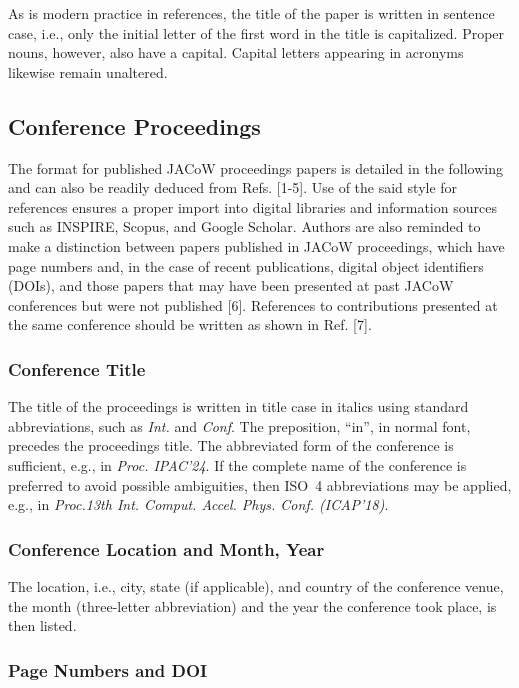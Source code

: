 \documentclass[%
               hyphens,       %
               ]{jacow}
\begin{document}
As is modern practice in references, the title of the paper is written in sentence case, i.e., only the initial letter of the first word in the title is capitalized. Proper nouns, however, also have a capital. Capital letters appearing in acronyms likewise remain unaltered.

\subsection{Conference Proceedings}

The format for published JACoW proceedings papers is detailed in the following and can also be readily deduced from Refs. [1-5]. Use of the said style for references ensures a proper import into digital libraries and information sources such as INSPIRE, Scopus, and Google Scholar. Authors are also reminded to make a distinction between papers published in JACoW proceedings, which have page numbers and, in the case of recent publications, digital object identifiers (DOIs), and those papers that may have been presented at past JACoW conferences but were not published [6]. References to contributions presented at the same conference should be written as shown in Ref. [7].

\subsubsection{Conference Title}

The title of the proceedings is written in title case in italics using standard abbreviations, 
such as \textit{Int.} and \textit{Conf}. The preposition, “in”, in normal font, precedes the proceedings title. The abbreviated form of the conference is sufficient, e.g., in \textit{Proc. IPAC’24}. If the complete name of the conference is preferred to avoid possible ambiguities, then ISO~4 abbreviations may be applied, e.g., in \textit{Proc.13th Int. Comput. Accel. Phys. Conf. (ICAP’18)}.

\subsubsection{Conference Location and Month, Year}

The location, i.e., city, state (if applicable), and country of the conference venue, the month (three-letter abbreviation) and the year the conference took place, is then listed.

\subsubsection{Page Numbers and DOI}
\end{document}
